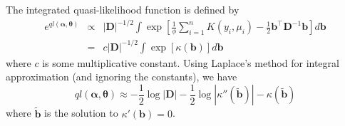 \documentclass[mathserif, 11pt, t]{beamer}
\newcommand{\m}[1]{\mathbf{\bm{#1}}}
\begin{document}
\begin{frame}

The integrated quasi-likelihood function is defined by
\begin{eqnarray*}
e^{ql(\m{\alpha}, \m{\theta})} &\propto& |\m{D}|^{-1/2}\int\exp\left[\frac{1}{\phi}\sum_{i=1}^nK(y_i,\mu_i)-\frac{1}{2}\m{b}^\top\m{D}^{-1}\m{b} \right]d\m{b} \\
&=& c|\m{D}|^{-1/2}\int\exp\left[ \kappa(\m{b}) \right] d\m{b} 
\end{eqnarray*}
where $c$ is some multiplicative constant. Using Laplace's method for integral approximation (and ignoring the constants), we have
\[ql(\m{\alpha}, \m{\theta}) \approx -\frac{1}{2}\log|\m{D}| -\frac{1}{2}\log|\kappa''(\tilde{\m{b}})| - \kappa(\tilde{\m{b}}) \]
where $\tilde{\m{b}}$ is the solution to $\kappa'(\m{b})=0$.

\end{frame}

\end{document}
